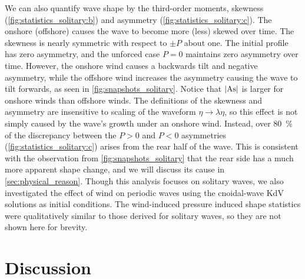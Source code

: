 \documentclass{jfm}
\DeclareMathOperator{\As}{As}
\begin{document}
We can also quantify wave shape by the third-order moments, skewness
(\cref{fig:statistics_solitary:b}) and asymmetry
(\cref{fig:statistics_solitary:c}).
The onshore (offshore) causes the wave to become more (less) skewed over
time.
The skewness is nearly symmetric with respect to $\pm P$ about one.
The initial profile has zero asymmetry, and the unforced case
$P=0$ maintains zero asymmetry over time.
However, the onshore wind causes a backwards tilt and negative
asymmetry, while the offshore wind increases the asymmetry causing the
wave to tilt forwards, as seen in \cref{fig:snapshots_solitary}.
Notice that $\abs{\As}$ is larger for onshore winds than offshore winds.
The definitions of the skewness and asymmetry are insensitive to scaling
of the waveform $\eta \to \lambda \eta$, so this effect is not simply
caused by the wave's growth under an onshore wind.
Instead, over \SI{80}{\percent} of the discrepancy between the $P>0$ and
$P<0$ asymmetries (\cref{fig:statistics_solitary:c}) arises from the
rear half of the wave.
This is consistent with the observation from
\cref{fig:snapshots_solitary} that the rear side has a much more
apparent shape change, and we will discuss its cause in
\cref{sec:physical_reason}.
Though this analysis focuses on solitary waves, we also investigated the
effect of wind on periodic waves using the cnoidal-wave KdV solutions as
initial conditions.
The wind-induced pressure induced shape statistics were qualitatively
similar to those derived for solitary waves, so they are not shown here
for brevity.

\section{\label{sec:discussion} Discussion}
\end{document}

